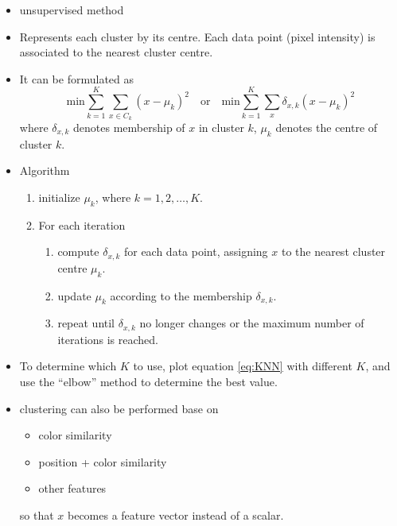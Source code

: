 \documentclass[twocolumn,landscape,10pt]{article}
\theoremstyle{definition}
\begin{document}
\begin{itemize}
    \item unsupervised method
    \item Represents each cluster by its centre.
        Each data point (pixel intensity) is associated to the nearest cluster
        centre.
    \item It can be formulated as
        \begin{equation}\label{eq:KNN}
            \text{min}\sum_{k=1}^{K} \sum_{x\in C_k}{(x-\mu_k)}^{2}
            \quad\text{or}\quad
            \text{min}\sum_{k=1}^{K} \sum_{x}\delta_{x,k}{(x-\mu_k)}^{2}
        \end{equation} 
        where $\delta_{x,k}$ denotes membership of $x$ in cluster $k$, $\mu_k$
        denotes the centre of cluster $k$.
    \item Algorithm
        \begin{enumerate}
            \item initialize $\mu_k$, where $k=1,2,\ldots,K$.
            \item For each iteration
                \begin{enumerate}
                    \item  compute $\delta_{x,k}$ for each data point, assigning
                        $x$ to the nearest cluster centre $\mu_k$.
                    \item update $\mu_k$ according to the membership
                        $\delta_{x,k}$.
                    \item repeat until $\delta_{x,k}$ no longer changes or the
                        maximum number of iterations is reached.
                \end{enumerate} 
        \end{enumerate} 
    \item To determine which $K$ to use, plot equation \eqref{eq:KNN} with
        different $K$, and use the ``elbow'' method to determine the best value.
    \item clustering can also be performed base on
        \begin{itemize}
            \item color similarity
            \item position + color similarity
            \item other features
        \end{itemize} 
        so that $x$ becomes a feature vector instead of a scalar.
\end{itemize} 
\end{document}
